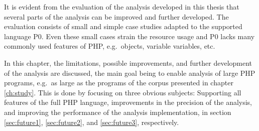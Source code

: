 It is evident from the evaluation of the analysis developed in this thesis that several parts of the analysis can be improved and further developed. The evaluation consists of small and simple case studies adapted to the supported language P0. Even these small cases strain the resource usage and P0 lacks many commonly used features of PHP, e.g.\ objects, variable variables, etc. 

In this chapter, the limitations, possible improvements, and further development of the analysis are discussed, the main goal being to enable analysis of large PHP programs, e.g.\ as large as the programs of the corpus presented in chapter \ref{ch:study}. This is done by focusing on three obvious subjects: Supporting all features of the full PHP language, improvements in the precision of the analysis, and improving the performance of the analysis implementation, in section \ref{sec:future1}, \ref{sec:future2}, and \ref{sec:future3}, respectively. 